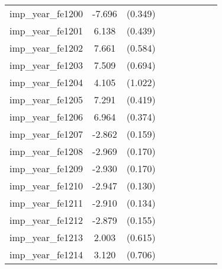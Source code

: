{\begin{tabular}{l*{4}{cc}}
imp\_year\_fe1200&   -7.696\sym{***}&  (0.349)&                  &         &                  &         &                  &         \\
imp\_year\_fe1201&    6.138\sym{***}&  (0.439)&                  &         &                  &         &                  &         \\
imp\_year\_fe1202&    7.661\sym{***}&  (0.584)&                  &         &                  &         &                  &         \\
imp\_year\_fe1203&    7.509\sym{***}&  (0.694)&                  &         &                  &         &                  &         \\
imp\_year\_fe1204&    4.105\sym{***}&  (1.022)&                  &         &                  &         &                  &         \\
imp\_year\_fe1205&    7.291\sym{***}&  (0.419)&                  &         &                  &         &                  &         \\
imp\_year\_fe1206&    6.964\sym{***}&  (0.374)&                  &         &                  &         &                  &         \\
imp\_year\_fe1207&   -2.862\sym{***}&  (0.159)&                  &         &                  &         &                  &         \\
imp\_year\_fe1208&   -2.969\sym{***}&  (0.170)&                  &         &                  &         &                  &         \\
imp\_year\_fe1209&   -2.930\sym{***}&  (0.170)&                  &         &                  &         &                  &         \\
imp\_year\_fe1210&   -2.947\sym{***}&  (0.130)&                  &         &                  &         &                  &         \\
imp\_year\_fe1211&   -2.910\sym{***}&  (0.134)&                  &         &                  &         &                  &         \\
imp\_year\_fe1212&   -2.879\sym{***}&  (0.155)&                  &         &                  &         &                  &         \\
imp\_year\_fe1213&    2.003\sym{**} &  (0.615)&                  &         &                  &         &                  &         \\
imp\_year\_fe1214&    3.120\sym{***}&  (0.706)&                  &         &                  &         &                  &         \\

\end{tabular}}
